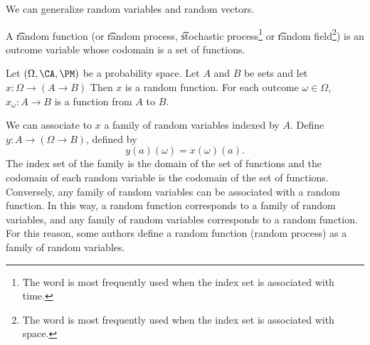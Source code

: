 

We can generalize random variables and random vectors.


A \t{random function} (or \t{random process}, \t{stochastic process}\footnote{The word  is most frequently used when the index set is associated with time.} or \t{random field}\footnote{The word  is most frequently used when the index set is associated with space.}) is an outcome variable whose codomain is a set of functions.


Let $(\Omega, \CA, \PM)$ be a probability space.
Let $A$ and $B$ be sets and let $x: \Omega \to (A \to B)$
Then $x$ is a random function.
For each outcome $\omega \in \Omega$, $x_{\omega}: A \to B$ is a function from $A$ to $B$.


We can associate to $x$ a family of random variables indexed by $A$.
Define $y: A \to (\Omega \to B)$, defined by
\[
  y(a)(\omega) = x(\omega)(a).
\]
The index set of the family is the domain of the set of functions and the codomain of each random variable is the codomain of the set of functions.
Conversely, any family of random variables can be associated with a random function.
In this way, a random function corresponds to a family of random variables, and any family of random variables corresponds to a random function.
For this reason, some authors define a random function (random process) as a family of random variables.


\blankpage
